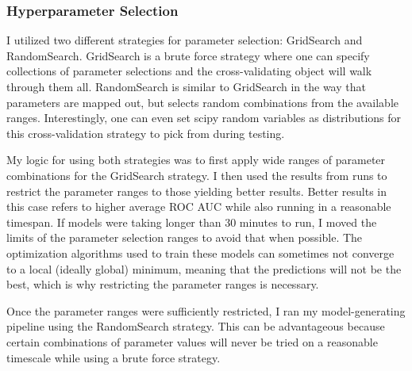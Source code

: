 \documentclass{article}
\begin{document}
            \subsubsection{Hyperparameter Selection}
                I utilized two different strategies for parameter selection: GridSearch and RandomSearch.
                GridSearch is a brute force strategy where one can specify collections of parameter selections and the cross-validating object will walk through them all. 
                RandomSearch is similar to GridSearch in the way that parameters are mapped out, but selects random combinations from the available ranges.
                Interestingly, one can even set scipy \cite{scipy} random variables as distributions for this cross-validation strategy to pick from during testing. 

                My logic for using both strategies was to first apply wide ranges of parameter combinations for the GridSearch strategy.
                I then used the results from runs to restrict the parameter ranges to those yielding better results.
                Better results in this case refers to higher average ROC AUC while also running in a reasonable timespan. 
                If models were taking longer than 30 minutes to run, I moved the limits of the parameter selection ranges to avoid that when possible.
                The optimization algorithms used to train these models can sometimes not converge to a local (ideally global) minimum, meaning that the predictions will not be the best, which is why restricting the parameter ranges is necessary.

                Once the parameter ranges were sufficiently restricted, I ran my model-generating pipeline using the RandomSearch strategy.
                This can be advantageous because certain combinations of parameter values will never be tried on a reasonable timescale while using a brute force strategy.
\end{document}
